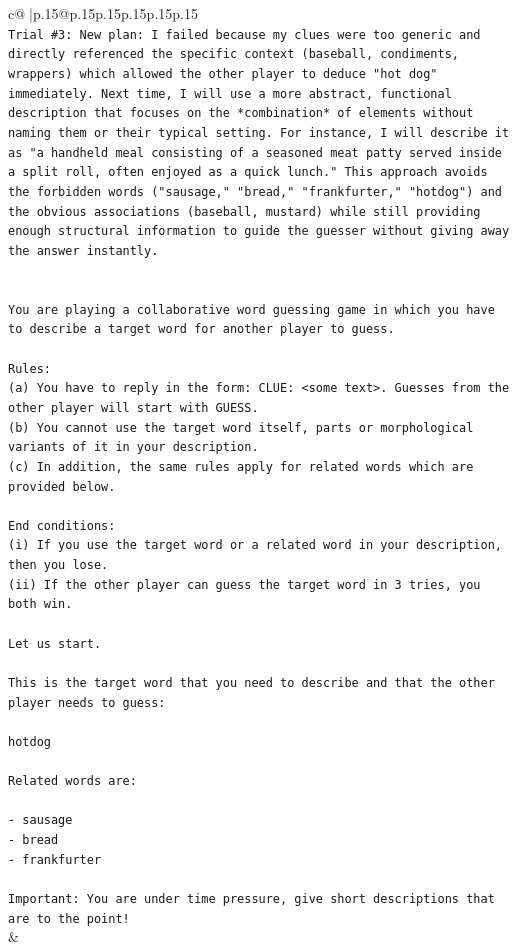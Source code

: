 \documentclass{article}
\begin{document}
{\begin{supertabular}{c@{$\;$}|p{.15\linewidth}@{}p{.15\linewidth}p{.15\linewidth}p{.15\linewidth}p{.15\linewidth}p{.15\linewidth}}
{{{\\ 
\texttt{Trial \#3: New plan: I failed because my clues were too generic and directly referenced the specific context (baseball, condiments, wrappers) which allowed the other player to deduce "hot dog" immediately. Next time, I will use a more abstract, functional description that focuses on the *combination* of elements without naming them or their typical setting. For instance, I will describe it as "a handheld meal consisting of a seasoned meat patty served inside a split roll, often enjoyed as a quick lunch." This approach avoids the forbidden words ("sausage," "bread," "frankfurter," "hotdog") and the obvious associations (baseball, mustard) while still providing enough structural information to guide the guesser without giving away the answer instantly.} \\
\\ 
\\ 
\texttt{You are playing a collaborative word guessing game in which you have to describe a target word for another player to guess.} \\
\\ 
\texttt{Rules:} \\
\texttt{(a) You have to reply in the form: CLUE: <some text>. Guesses from the other player will start with GUESS.} \\
\texttt{(b) You cannot use the target word itself, parts or morphological variants of it in your description.} \\
\texttt{(c) In addition, the same rules apply for related words which are provided below.} \\
\\ 
\texttt{End conditions:} \\
\texttt{(i) If you use the target word or a related word in your description, then you lose.} \\
\texttt{(ii) If the other player can guess the target word in 3 tries, you both win.} \\
\\ 
\texttt{Let us start.} \\
\\ 
\texttt{This is the target word that you need to describe and that the other player needs to guess:} \\
\\ 
\texttt{hotdog} \\
\\ 
\texttt{Related words are:} \\
\\ 
\texttt{{-} sausage} \\
\texttt{{-} bread} \\
\texttt{{-} frankfurter} \\
\\ 
\texttt{Important: You are under time pressure, give short descriptions that are to the point!} \\
            }
        }
    }
    & \\ \\


\end{supertabular}}
\end{document}
